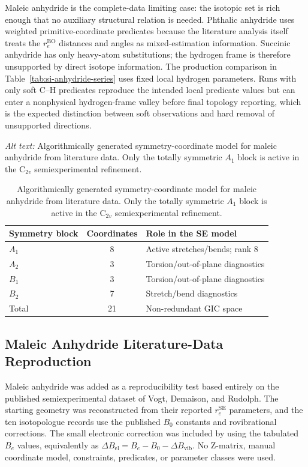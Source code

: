 \documentclass[12pt]{article}
\begin{document}
Maleic anhydride is the complete-data limiting case: the isotopic set is rich
enough that no auxiliary structural relation is needed. Phthalic anhydride
uses weighted primitive-coordinate predicates because the literature analysis
itself treats the $r_e^\mathrm{BO}$ distances and angles as mixed-estimation
information. Succinic anhydride has only heavy-atom substitutions; the
hydrogen frame is therefore unsupported by direct isotope information. The
production comparison in Table~\ref{tab:si-anhydride-series} uses fixed local
hydrogen parameters. Runs with only soft C--H predicates reproduce the intended
local predicate values but can enter a nonphysical hydrogen-frame valley before
final topology reporting, which is the expected distinction between soft
observations and hard removal of unsupported directions.

\begin{table}
\caption{Algorithmically generated symmetry-coordinate model for maleic
anhydride from literature data. Only the totally symmetric $A_1$ block is
active in the C$_{2v}$ semiexperimental refinement.}
\label{tab:si-maleic-symmetry-gics}
\par\smallskip\noindent\textit{Alt text:} Algorithmically generated symmetry-coordinate model for maleic anhydride from literature data. Only the totally symmetric $A_1$ block is active in the C$_{2v}$ semiexperimental refinement.
\small
\begin{tabular}{lcl}
\toprule
Symmetry block & Coordinates & Role in the SE model \\
\midrule
$A_1$ & 8 & Active stretches/bends; rank 8 \\
$A_2$ & 3 & Torsion/out-of-plane diagnostics \\
$B_1$ & 3 & Torsion/out-of-plane diagnostics \\
$B_2$ & 7 & Stretch/bend diagnostics \\
\midrule
Total & 21 & Non-redundant GIC space \\
\bottomrule
\end{tabular}
\end{table}

\subsection{Maleic Anhydride Literature-Data Reproduction}

Maleic anhydride was added as a reproducibility test based entirely on the
published semiexperimental dataset of Vogt, Demaison, and Rudolph. The
starting geometry was reconstructed from their reported $r_e^\mathrm{SE}$
parameters, and the ten isotopologue records use the published $B_0$
constants and rovibrational corrections. The small electronic correction was
included by using the tabulated $B_e$ values, equivalently as
$\Delta B_\mathrm{el}=B_e-B_0-\Delta B_\mathrm{vib}$. No Z-matrix, manual
coordinate model, constraints, predicates, or parameter classes were used.
\end{document}
